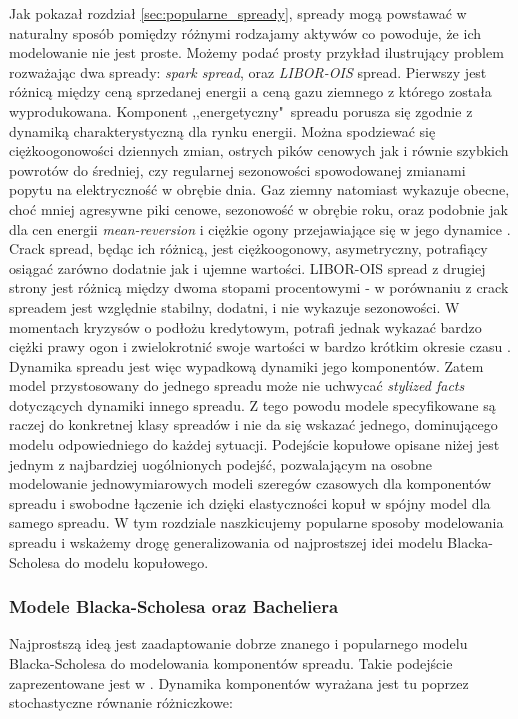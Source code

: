 Jak pokazał rozdział \ref{sec:popularne_spready}, spready mogą powstawać w naturalny sposób pomiędzy różnymi rodzajamy aktywów co powoduje, że ich modelowanie nie jest proste. Możemy podać prosty przykład ilustrujący problem rozważając dwa spready: \emph{spark spread}, oraz \emph{LIBOR-OIS} spread. Pierwszy jest różnicą między ceną sprzedanej energii a ceną gazu ziemnego z którego została wyprodukowana. Komponent ,,energetyczny"~spreadu porusza się zgodnie z dynamiką charakterystyczną dla rynku energii. Można spodziewać się ciężkoogonowości dziennych zmian, ostrych pików cenowych jak i równie szybkich powrotów do średniej, czy regularnej sezonowości spowodowanej zmianami popytu na elektryczność w obrębie dnia. Gaz ziemny natomiast wykazuje obecne, choć mniej agresywne piki cenowe, sezonowość w obrębie roku, oraz podobnie jak dla cen energii \emph{mean-reversion} i ciężkie ogony przejawiające się w jego dynamice \cite{Espen_Crack_Spread_Copula}. Crack spread, będąc ich różnicą, jest ciężkoogonowy, asymetryczny, potrafiący osiągać zarówno dodatnie jak i ujemne wartości. LIBOR-OIS spread z drugiej strony jest różnicą między dwoma stopami procentowymi - w porównaniu z crack spreadem jest względnie stabilny, dodatni, i nie wykazuje sezonowości. W momentach kryzysów o podłożu kredytowym, potrafi jednak wykazać bardzo ciężki prawy ogon i zwielokrotnić swoje wartości w bardzo krótkim okresie czasu \cite{Libor_OIS_model}.\\

Dynamika spreadu jest więc wypadkową dynamiki jego komponentów. Zatem model przystosowany do jednego spreadu może nie uchwycać \emph{stylized facts} dotyczących dynamiki innego spreadu. Z tego powodu modele specyfikowane są raczej do konkretnej klasy spreadów i nie da się wskazać jednego, dominującego modelu odpowiedniego do każdej sytuacji. Podejście kopułowe opisane niżej jest jednym z najbardziej uogólnionych podejść, pozwalającym na osobne modelowanie jednowymiarowych modeli szeregów czasowych dla komponentów spreadu i swobodne łączenie ich dzięki elastyczności kopuł w spójny model dla samego spreadu.
W tym rozdziale naszkicujemy popularne sposoby modelowania spreadu i wskażemy drogę generalizowania od najprostszej idei modelu Blacka-Scholesa do modelu kopułowego.

\subsubsection{Modele Blacka-Scholesa oraz Bacheliera}

Najprostszą ideą jest zaadaptowanie dobrze znanego i popularnego modelu Blacka-Scholesa \cite{Black_Scholes} do modelowania komponentów spreadu. Takie podejście zaprezentowane jest w \cite{Bjerksund_Spread_Options_Lognormal}. Dynamika komponentów wyrażana jest tu poprzez stochastyczne równanie różniczkowe:

